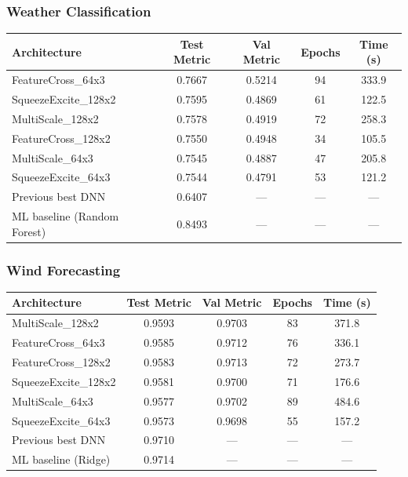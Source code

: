\documentclass[11pt,a4paper]{article}
\begin{document}
\subsubsection*{Weather Classification}

\begin{center}
\small
\begin{tabular}{lcccc}
\toprule
\textbf{Architecture} & \textbf{Test Metric} & \textbf{Val Metric} & \textbf{Epochs} & \textbf{Time (s)} \\
\midrule
FeatureCross\_64x3 & 0.7667 & 0.5214 & 94 & 333.9 \\
SqueezeExcite\_128x2 & 0.7595 & 0.4869 & 61 & 122.5 \\
MultiScale\_128x2 & 0.7578 & 0.4919 & 72 & 258.3 \\
FeatureCross\_128x2 & 0.7550 & 0.4948 & 34 & 105.5 \\
MultiScale\_64x3 & 0.7545 & 0.4887 & 47 & 205.8 \\
SqueezeExcite\_64x3 & 0.7544 & 0.4791 & 53 & 121.2 \\
\midrule
Previous best DNN & 0.6407 & --- & --- & --- \\
ML baseline (Random Forest) & 0.8493 & --- & --- & --- \\
\bottomrule
\end{tabular}
\end{center}

\subsubsection*{Wind Forecasting}

\begin{center}
\small
\begin{tabular}{lcccc}
\toprule
\textbf{Architecture} & \textbf{Test Metric} & \textbf{Val Metric} & \textbf{Epochs} & \textbf{Time (s)} \\
\midrule
MultiScale\_128x2 & 0.9593 & 0.9703 & 83 & 371.8 \\
FeatureCross\_64x3 & 0.9585 & 0.9712 & 76 & 336.1 \\
FeatureCross\_128x2 & 0.9583 & 0.9713 & 72 & 273.7 \\
SqueezeExcite\_128x2 & 0.9581 & 0.9700 & 71 & 176.6 \\
MultiScale\_64x3 & 0.9577 & 0.9702 & 89 & 484.6 \\
SqueezeExcite\_64x3 & 0.9573 & 0.9698 & 55 & 157.2 \\
\midrule
Previous best DNN & 0.9710 & --- & --- & --- \\
ML baseline (Ridge) & 0.9714 & --- & --- & --- \\
\bottomrule
\end{tabular}
\end{center}
\end{document}
